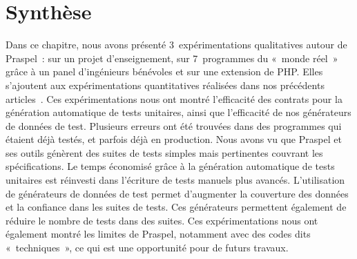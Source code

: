 \section{Synthèse}
\label{section:experimentation:other}

Dans ce chapitre, nous avons présenté 3~expérimentations qualitatives autour de
Praspel~: sur un projet d'enseignement, sur 7~programmes du «~monde réel~» grâce
à un panel d'ingénieurs bénévoles et sur une extension de PHP. Elles s'ajoutent
aux expérimentations quantitatives réalisées dans nos précédents
articles~. Ces
expérimentations nous ont montré l'efficacité des contrats pour la génération
automatique de tests unitaires, ainsi que l'efficacité de nos générateurs de
données de test. Plusieurs erreurs ont été trouvées dans des programmes qui
étaient déjà testés, et parfois déjà en production. Nous avons vu que Praspel et
ses outils génèrent des suites de tests simples mais pertinentes couvrant les
spécifications. Le temps économisé grâce à la génération automatique de tests
unitaires est réinvesti dans l'écriture de tests manuels plus avancés.
L'utilisation de générateurs de données de test permet d'augmenter la couverture
des données et la confiance dans les suites de tests. Ces générateurs permettent
également de réduire le nombre de tests dans des suites. Ces expérimentations
nous ont également montré les limites de Praspel, notamment avec des codes dits
«~techniques~»,  ce qui est une opportunité pour de futurs travaux.
